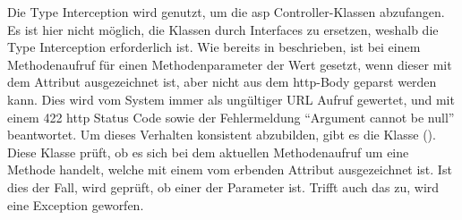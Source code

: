 Die Type Interception wird genutzt, um die \gls{asp} Controller-Klassen abzufangen. Es ist hier nicht möglich, die Klassen durch Interfaces zu ersetzen, weshalb die Type Interception erforderlich ist. Wie bereits in  beschrieben, ist bei einem Methodenaufruf für einen Methodenparameter der Wert  gesetzt, wenn dieser mit dem \lstcode{[FromBody]} Attribut ausgezeichnet ist, aber nicht aus dem \gls{http}-Body geparst werden kann. Dies wird vom System immer als ungültiger URL Aufruf gewertet, und mit einem 422 \gls{http} Status Code sowie der Fehlermeldung \enquote{Argument cannot be null} beantwortet. Um dieses Verhalten konsistent abzubilden, gibt es die  Klasse (). Diese Klasse prüft, ob es sich bei dem aktuellen Methodenaufruf um eine Methode handelt, welche mit einem vom \lstcode{[HttpMethodAttribute]} erbenden Attribut ausgezeichnet ist. Ist dies der Fall, wird geprüft, ob einer der Parameter  ist. Trifft auch das zu, wird eine Exception geworfen.

